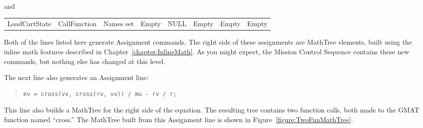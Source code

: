 \noindent and

\begin{center}
\begin{small}
\tablelasttail{\hline}
\begin{supertabular}{|l|l|m{0.56in}|m{0.55in}|m{0.55in}|m{0.55in}|m{0.55in}|m{0.55in}|}
LoadCartState & CallFunction & Names set & Empty & NULL & Empty & Empty & Empty\\
\end{supertabular}
\end{small}
\end{center}

Both of the lines listed here generate Assignment commands.  The right side of these assignments are
MathTree elements, built using the inline math features described in
Chapter~\ref{chapter:InlineMath}.  As you might expect, the Mission Control Sequence contains these
new commands, but nothing else has changed at this level.

The next line also generates an Assignment line:

\begin{quote}
\begin{verbatim}
ev = cross(vv, cross(rv, vv)) / mu - rv / r;
\end{verbatim}
\end{quote}

\noindent This line also builds a MathTree for the right side of the equation.  The resulting tree
contains two function calls, both made to the GMAT function named ``cross.''  The MathTree built
from this Assignment line is shown in Figure~\ref{figure:TwoFunMathTree}.


